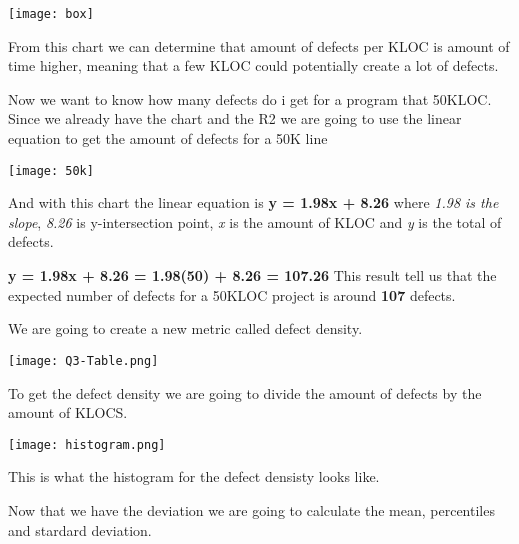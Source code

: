 \begin{center}
    \texttt{[image: box]}    
\end{center}
\noindent
From this chart we can determine that amount of defects per KLOC is amount of time higher, meaning that a few KLOC could potentially create a lot of defects.

\pagebreak
\noindent
Now we want to know how many defects do i get for a program that 50KLOC.
\noindent\newline \newline 
Since we already have the chart and the R2 we are going to use the linear equation to get the amount of defects for a 50K line

\begin{center}
    \texttt{[image: 50k]}    
\end{center}

\noindent\newline 
And with this chart the linear equation is \textbf{y = 1.98x + 8.26} where \textit{1.98 is the slope}, \textit{8.26} is y-intersection point, \textit{x} is the amount of KLOC and \textit{y} is the total of defects.

\noindent\newline \newline
\textbf{y = 1.98x + 8.26 = 1.98(50) + 8.26 = 107.26}
\noindent\newline\newline 
This result tell us that the expected number of defects for a 50KLOC project is around \textbf{107} defects.

\pagebreak

\noindent
We are going to create a new metric called defect density.

\begin{center}
    \texttt{[image: Q3-Table.png]}    
\end{center}

\noindent
To get the defect density we are going to divide the amount of defects by the amount of KLOCS.

\begin{center}
    \texttt{[image: histogram.png]}    
\end{center}

\noindent
This is what the histogram for the defect densisty looks like.

\pagebreak
\noindent
Now that we have the deviation we are going to calculate the mean, percentiles and stardard deviation.

